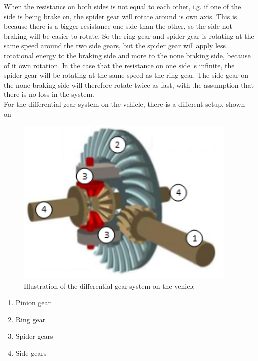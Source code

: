 When the resistance on both sides is not equal to each other, i.g. if one of the side is being brake on, the spider gear will rotate around is own axis. This is because there is a bigger resistance one side than the other, so the side not braking will be easier to rotate. So the ring gear and spider gear is rotating at the same speed around the two side gears, but the spider gear will apply less rotational energy to the braking side and more to the none braking side, because of it own rotation. In the case that the resistance on one side is infinite, the spider gear will be rotating at the same speed as the ring gear. The side gear on the none braking side will therefore rotate twice as fast, with the assumption that there is no loss in the system.\\

For the differential gear system on the vehicle, there is a different setup, shown on 

\begin{minipage}{\linewidth}
      \centering
      \begin{minipage}{0.65\linewidth}
          \begin{figure}[H]
              \includegraphics[width=0.95\textwidth]{figures/diffGearFull}
              \caption{Illustration of the differential gear system on the vehicle \cite{MechanicalEngineering}}
          \end{figure}
      \end{minipage}
      \hspace{0.05\linewidth}
      \begin{minipage}{0.25\linewidth}
      		\begin{enumerate}
      			\item Pinion gear
      			\item Ring gear
      			\item Spider gears
      			\item Side gears
      		\end{enumerate}
      \end{minipage}
  \end{minipage}





